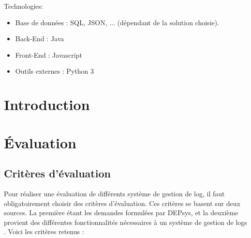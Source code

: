 \documentclass[paper=a4, fontsize=11pt]{scrartcl}
\begin{document}
Technologies:

\begin{itemize}
    \item Base de données : SQL, JSON, ... (dépendant de la solution choisie).
    \item Back-End : Java
    \item Front-End : Javascript 
    \item Outils externes : Python 3
\end{itemize}
\newpage

\renewcommand{\contentsname}{Table des matières}
\tableofcontents

\newpage

\section{Introduction}
\section{Évaluation}

\subsection{Critères d'évaluation}

Pour réaliser une évaluation de différents système de gestion de log, il faut obligatoirement choisir des critères d'évaluation. Ces critères se basent sur deux sources. La première étant les demandes formulées par DEPsys, et la deuxième provient des différentes fonctionnalités nécessaires à un système de gestion de logs \cite{noauthor_what_nodate} \cite{noauthor_gestion_2019}. Voici les critères retenus :
\end{document}
